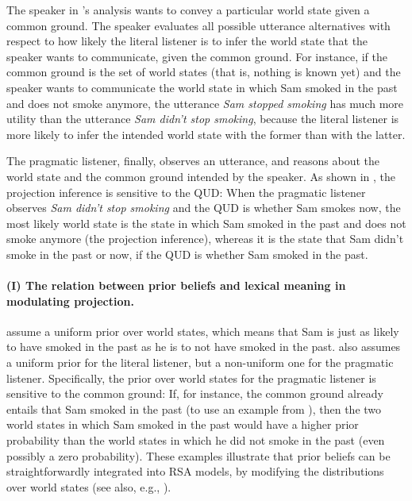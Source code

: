 \documentclass[11pt,fleqn]{article}
\newcommand{\6}{\mbox{$[\hspace*{-.6mm}[$}}
\newcommand{\9}{\mbox{$]\hspace*{-.6mm}]$}}
\newcommand{\citepos}[1]{\citeauthor{#1}'s \citeyear{#1}}
\begin{document}
The speaker in \citepos{qing-etal2016} analysis wants to convey a particular world state given a common ground. The speaker evaluates all possible utterance alternatives with respect to how likely the literal listener is to infer the world state that the speaker wants to communicate, given the common ground. For instance, if the common ground is the set of world states (that is, nothing is known yet) and the speaker wants to communicate the world state in which Sam smoked in the past and does not smoke anymore, the utterance {\em Sam stopped smoking} has much more utility than the utterance {\em Sam didn't stop smoking}, because the literal listener is more likely to infer the intended world state with the former than with the latter. 

The pragmatic listener, finally, observes an utterance, and reasons about the world state and the common ground intended by the speaker. As shown in \citealt{qing-etal2016}, the projection inference is sensitive to the QUD: When the pragmatic listener observes {\em Sam didn't stop smoking} and the QUD is whether Sam smokes now, the most likely world state is the state in which Sam smoked in the past and does not smoke anymore (the projection inference), whereas it is the state that Sam didn't smoke in the past or now, if the QUD is whether Sam smoked in the past.

\paragraph{(I) The relation between prior beliefs and lexical meaning in modulating projection.}

\citealt{qing-etal2016} assume a uniform prior over world states, which means that Sam is just as likely to have smoked in the past as he is to not have smoked in the past. \citealt{warstadt2022} also assumes a uniform prior for the literal listener, but a non-uniform one for the pragmatic listener. Specifically, the prior over world states for the pragmatic listener is sensitive to the common ground: If, for instance, the common ground already entails that Sam smoked in the past (to use an example from \citealt{qing-etal2016}), then the two world states in which Sam smoked in the past would have a higher prior probability than the world states in which he did not smoke in the past (even possibly a zero probability). These examples illustrate that prior beliefs can be straightforwardly integrated into RSA models, by modifying the distributions over world states (see also, e.g., \citealt{goodman-stuhlmueller2013,degen2023-RSA}).
\end{document}

